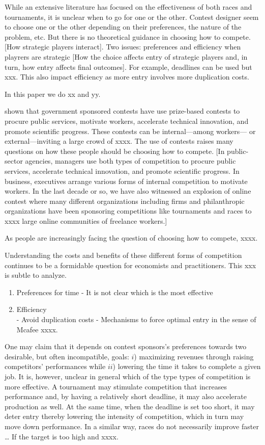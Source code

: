 \documentclass[10pt, titlepage]{article}
\begin{document}
While an extensive literature has focused on the effectiveness of both
races and tournaments, it is unclear when to go for one or the other.
Contest designer seem to choose one or the other depending on their
preferences, the nature of the problem, etc. But there is no theoretical
guidance in choosing how to compete. {[}How strategic players
interact{]}. Two issues: preferences and efficiency when playrers are
strategic {[}How the choice affects entry of strategic players and, in
turn, how entry affects final outcomes{]}. For example, deadlines can be
used but xxx. This also impact efficiency as more entry involves more
duplication costs.

In this paper we do xx and yy.

shown that government sponsored contests have use prize-based contests
to procure public services, motivate workers, accelerate technical
innovation, and promote scientific progress. These contests can be
internal---among workers--- or external---inviting a large crowd of
xxxx. The use of contests raises many questions on how these people
should be choosing how to compete. {[}In public-sector agencies,
managers use both types of competition to procure public services,
accelerate technical innovation, and promote scientific progress. In
business, executives arrange various forms of internal competition to
motivate workers. In the last decade or so, we have also witnessed an
explosion of online contest where many different organizations including
firms and philanthropic organizations have been sponsoring competitions
like tournaments and races to xxxx large online communities of freelance
workers.{]}

As people are increasingly facing the question of choosing how to
compete, xxxx.

Understanding the costs and benefits of these different forms of
competition continues to be a formidable question for economists and
practitioners. This xxx is subtle to analyze.

\begin{enumerate}
\def\labelenumi{\arabic{enumi}.}
\item
  Preferences for time - It is not clear which is the most effective
\item
  Efficiency\\
  - Avoid duplication costs - Mechanisms to force optimal entry in the
  sense of Mcafee xxxx.
\end{enumerate}

One may claim that it depends on contest sponsors's preferences towards
two desirable, but often incompatible, goals: \(i\)) maximizing revenues
through raising competitors' performances while \(ii\)) lowering the
time it takes to complete a given job. It is, however, unclear in
general which of the type types of competition is more effective. A
tournament may stimulate competition that increases performance and, by
having a relatively short deadline, it may also accelerate production as
well. At the same time, when the deadline is set too short, it may deter
entry thereby lowering the intensity of competition, which in turn may
move down performance. In a similar way, races do not necessarily
improve faster \ldots{} If the target is too high and xxxx.
\end{document}
